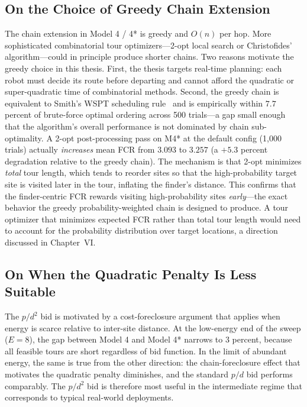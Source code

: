 \begin{doublespacing}
\subsection{On the Choice of Greedy Chain Extension}

The chain extension in Model 4 / 4* is greedy and $O(n)$ per hop.
More sophisticated combinatorial tour optimizers---2-opt local search
or Christofides' algorithm---could in principle produce shorter chains.
Two reasons motivate the greedy choice in this thesis. First, the
thesis targets real-time planning: each robot must decide its route
before departing and cannot afford the quadratic or super-quadratic
time of combinatorial methods. Second, the greedy chain is equivalent
to Smith's WSPT scheduling rule~\citep{Smith1956} and is empirically
within $7.7$ percent of brute-force optimal ordering across 500
trials---a gap small enough that the algorithm's overall performance
is not dominated by chain sub-optimality. A 2-opt post-processing pass on M4* at the default config (1,000 trials)
actually \emph{increases} mean FCR from $3.093$ to $3.257$
(a $+5.3$ percent degradation relative to the greedy chain). The
mechanism is that 2-opt minimizes \emph{total} tour length, which
tends to reorder sites so that the high-probability target site is
visited later in the tour, inflating the finder's distance. This
confirms that the finder-centric FCR rewards visiting
high-probability sites \emph{early}---the exact behavior the greedy
probability-weighted chain is designed to produce. A tour optimizer
that minimizes expected FCR rather than total tour length would need
to account for the probability distribution over target locations,
a direction discussed in Chapter~VI.

\subsection{On When the Quadratic Penalty Is Less Suitable}

The $p/d^2$ bid is motivated by a cost-foreclosure argument that
applies when energy is scarce relative to inter-site distance. At the
low-energy end of the sweep ($E = 8$), the gap between Model 4 and
Model 4* narrows to $3$ percent, because all feasible tours are short
regardless of bid function. In the limit of abundant energy, the same
is true from the other direction: the chain-foreclosure effect that
motivates the quadratic penalty diminishes, and the standard $p/d$
bid performs comparably. The $p/d^2$ bid is therefore most useful in
the intermediate regime that corresponds to typical real-world
deployments.


\end{doublespacing}
